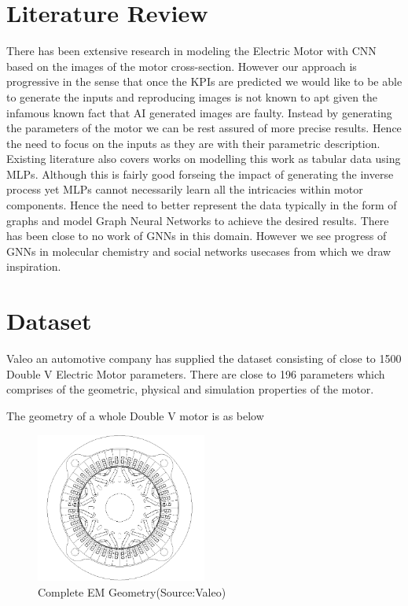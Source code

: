\documentclass{report} %
\begin{document}
\chapter*{Literature Review} 
There has been extensive research in modeling the Electric Motor with CNN based on the images of the motor cross-section. 
However our approach is progressive in the sense that once the KPIs are predicted we would like to be able to generate the inputs and reproducing images is not known to apt given the infamous known fact that AI generated images are faulty.
Instead by generating the parameters of the motor we can be rest assured of more precise results. Hence the need to focus on the inputs as they are with their parametric description.
Existing literature also covers works on modelling this work as tabular data using MLPs. Although this is fairly good forseing the impact of generating the inverse process yet MLPs cannot necessarily learn all the intricacies within motor components.
Hence the need to better represent the data typically in the form of graphs and model Graph Neural Networks to achieve the desired results. 
There has been close to no work of GNNs in this domain. However we see progress of GNNs in molecular chemistry and social networks usecases from which we draw inspiration.

\newpage 

\chapter*{Dataset} 
Valeo an automotive company has supplied the dataset consisting of close to 1500 Double V Electric Motor parameters. 
There are close to 196 parameters which comprises of the geometric, physical and simulation properties of the motor.

The geometry of a whole Double V motor is as below

\begin{figure}[h]
    \centering
    \includegraphics[width=0.5\textwidth]{./ReportImages/FullMotorv2.png} 
    \caption{Complete EM Geometry(Source:Valeo)}
    \label{fig:Full Motor}
\end{figure}
\end{document}
